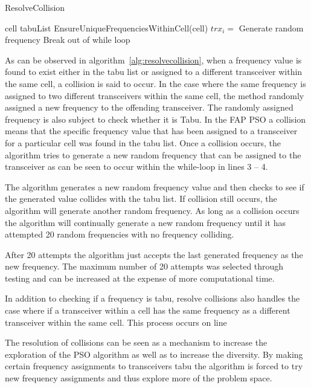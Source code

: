 \begin{algorithm}[H]
\caption{ResolveCollision}
\label{alg:resolvecollision}
\begin{algorithmic}[1]
	\Require cell
	\Require tabuList
    \State EnsureUniqueFrequenciesWithinCell(cell)
				\State $trx_i = $ Generate random frequency
					\State Break out of while loop
				\EndIf
			\EndWhile
	\EndFor
\end{algorithmic}
\end{algorithm}

As can be observed in algorithm~\ref{alg:resolvecollision}, when a frequency value is found to exist either in the tabu list or assigned to a different transceiver within the same cell,  a collision is said to occur. In the case where the same frequency is assigned to two different transceivers within the same cell, the method randomly assigned a new frequency to the offending transceiver. The randomly assigned frequency is also subject to check whether it is Tabu.  In the \gls{FAP} \gls{PSO} a collision means that the specific frequency value that has been assigned to a transceiver for a particular cell was found in the tabu list. Once a collision occurs, the algorithm tries to generate a new random frequency that can be assigned to the transceiver as can be seen to occur within the while-loop in lines 3 -- 4.

The algorithm generates a new random frequency value and then checks to see if the generated value collides with the tabu list. If collision still occurs, the algorithm will generate another random frequency. As long as a collision occurs the algorithm will continually generate a new random frequency until it has attempted 20 random frequencies with no frequency colliding. 

After 20 attempts the algorithm just accepts the last generated frequency as the new frequency. The maximum number of 20  attempts was selected through testing and can be increased at the expense of more computational time. 

In addition to checking if a frequency is tabu, resolve collisions also handles the case where if a transceiver within a cell has the same frequency as a different transceiver within the same cell. This process occurs on line 

The resolution of collisions can be seen as a mechanism to increase the exploration of the \gls{PSO} algorithm as well as to increase the diversity. By making certain frequency assignments to transceivers tabu the algorithm is forced to try new frequency assignments and thus explore more of the problem space.

